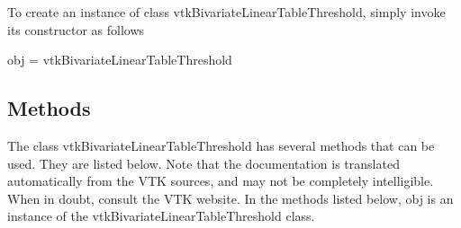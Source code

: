 To create an instance of class vtk\-Bivariate\-Linear\-Table\-Threshold, simply invoke its constructor as follows \begin{DoxyVerb}  obj = vtkBivariateLinearTableThreshold
\end{DoxyVerb}
 \hypertarget{vtkwidgets_vtkxyplotwidget_Methods}{}\subsection{Methods}\label{vtkwidgets_vtkxyplotwidget_Methods}
The class vtk\-Bivariate\-Linear\-Table\-Threshold has several methods that can be used. They are listed below. Note that the documentation is translated automatically from the V\-T\-K sources, and may not be completely intelligible. When in doubt, consult the V\-T\-K website. In the methods listed below, {\ttfamily obj} is an instance of the vtk\-Bivariate\-Linear\-Table\-Threshold class. 
